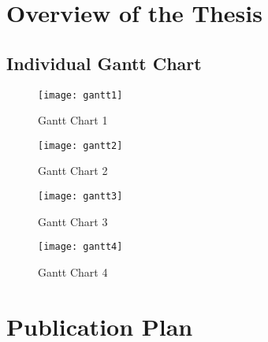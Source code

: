 \section{Overview of the Thesis}
\subsection{Individual Gantt Chart}
\begin{figure}[ht]
	\centering
	\texttt{[image: gantt1]}
	\caption{Gantt Chart 1}
\end{figure}

\begin{figure}[ht]
	\centering
	\texttt{[image: gantt2]}
	\caption{Gantt Chart 2}
\end{figure}

\begin{figure}[ht]
	\centering
	\texttt{[image: gantt3]}
	\caption{Gantt Chart 3}
\end{figure}

\begin{figure}[ht]
	\centering
	\texttt{[image: gantt4]}
	\caption{Gantt Chart 4}
\end{figure}
\ifPhD
\section{Publication Plan}
\graytx{\blindtext}
\fi

\fi



